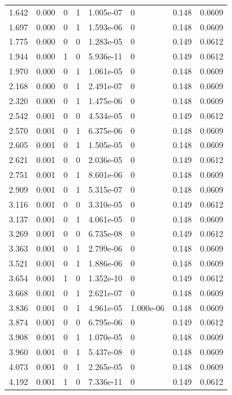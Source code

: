 \documentclass[preview]{standalone}
\begin{document}
{{\begin{tabular}{L{1.2cm}C{1.2cm} C{0.3cm}C{0.5cm} C{1.4cm}C{1.4cm} C{1.4cm}C{1.4cm}}
  1.642  &  0.000  & 0     &  1 &  1.005e-07  & 0  & 0.148 &  0.0609   \\ 
  1.697  &  0.000  & 0     &  1 &  1.593e-06  & 0  & 0.148 &  0.0609   \\ 
  1.775  &  0.000  & 0     &  0 &  1.283e-05  & 0  & 0.149 &  0.0612   \\ 
  1.944  &  0.000  & 1     &  0 &  5.936e-11  & 0  & 0.149 &  0.0612   \\ 
  1.970  &  0.000  & 0     &  1 &  1.061e-05  & 0  & 0.148 &  0.0609   \\ 
  2.168  &  0.000  & 0     &  1 &  2.491e-07  & 0  & 0.148 &  0.0609   \\ 
  2.320  &  0.000  & 0     &  1 &  1.475e-06  & 0  & 0.148 &  0.0609   \\ 
  2.542  &  0.001  & 0     &  0 &  4.534e-05  & 0  & 0.149 &  0.0612   \\ 
  2.570  &  0.001  & 0     &  1 &  6.375e-06  & 0  & 0.148 &  0.0609   \\ 
  2.605  &  0.001  & 0     &  1 &  1.505e-05  & 0  & 0.148 &  0.0609   \\ 
  2.621  &  0.001  & 0     &  0 &  2.036e-05  & 0  & 0.149 &  0.0612   \\ 
  2.751  &  0.001  & 0     &  1 &  8.601e-06  & 0  & 0.148 &  0.0609   \\ 
  2.909  &  0.001  & 0     &  1 &  5.315e-07  & 0  & 0.148 &  0.0609   \\ 
  3.116  &  0.001  & 0     &  0 &  3.310e-05  & 0  & 0.149 &  0.0612   \\ 
  3.137  &  0.001  & 0     &  1 &  4.061e-05  & 0  & 0.148 &  0.0609   \\ 
  3.269  &  0.001  & 0     &  0 &  6.735e-08  & 0  & 0.149 &  0.0612   \\ 
  3.363  &  0.001  & 0     &  1 &  2.799e-06  & 0  & 0.148 &  0.0609   \\ 
  3.521  &  0.001  & 0     &  1 &  1.886e-06  & 0  & 0.148 &  0.0609   \\ 
  3.654  &  0.001  & 1     &  0 &  1.352e-10  & 0  & 0.149 &  0.0612   \\ 
  3.668  &  0.001  & 0     &  1 &  2.621e-07  & 0  & 0.148 &  0.0609   \\ 
  3.836  &  0.001  & 0     &  1 &  4.961e-05  & 1.000e-06  & 0.148 &  0.0609   \\ 
  3.874  &  0.001  & 0     &  0 &  6.795e-06  & 0  & 0.149 &  0.0612   \\ 
  3.908  &  0.001  & 0     &  1 &  1.070e-05  & 0  & 0.148 &  0.0609   \\ 
  3.960  &  0.001  & 0     &  1 &  5.437e-08  & 0  & 0.148 &  0.0609   \\ 
  4.073  &  0.001  & 0     &  1 &  2.265e-05  & 0  & 0.148 &  0.0609   \\ 
  4.192  &  0.001  & 1     &  0 &  7.336e-11  & 0  & 0.149 &  0.0612   \\ 
\hline 
\end{tabular} 

}}
\end{document}
